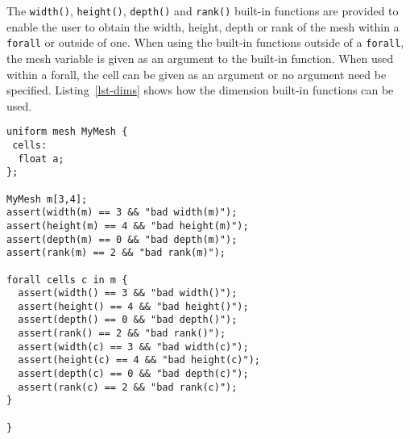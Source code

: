 The \texttt{width()}, \texttt{height()}, \texttt{depth()} and \texttt{rank()} 
built-in functions are provided to enable
the user to obtain the width, height, depth or rank of the mesh within a \texttt{forall} or outside of one.  
When using the built-in functions outside of a \texttt{forall}, the mesh variable is given as an argument
to the built-in function.  When used within a forall, the cell can be given as an argument or no argument 
need be specified.
Listing~\ref{lst-dims} shows how the dimension built-in functions can be used.

\par\bigskip
\begin{lstlisting}[float=h,label=lst-dims,
	caption={Accessing the dimensions of a mesh.}]
uniform mesh MyMesh {
 cells: 
  float a;
};

MyMesh m[3,4];
assert(width(m) == 3 && "bad width(m)"); 
assert(height(m) == 4 && "bad height(m)"); 
assert(depth(m) == 0 && "bad depth(m)");
assert(rank(m) == 2 && "bad rank(m)"); 

forall cells c in m {
  assert(width() == 3 && "bad width()"); 
  assert(height() == 4 && "bad height()"); 
  assert(depth() == 0 && "bad depth()"); 
  assert(rank() == 2 && "bad rank()"); 
  assert(width(c) == 3 && "bad width(c)"); 
  assert(height(c) == 4 && "bad height(c)"); 
  assert(depth(c) == 0 && "bad depth(c)"); 
  assert(rank(c) == 2 && "bad rank(c)"); 
}

}
\end{lstlisting}
\par\bigskip\noindent






